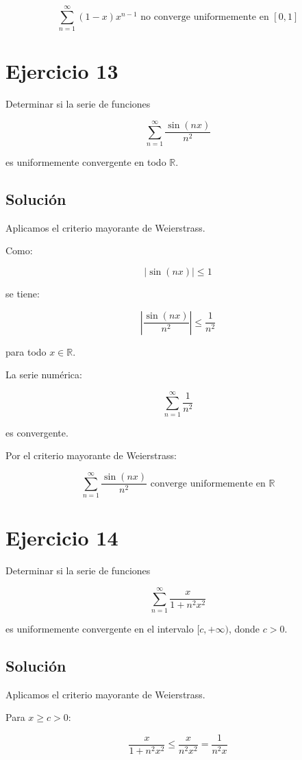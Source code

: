 \documentclass[fleqn]{article}
\begin{document}
	\[
	\boxed{
	\sum_{n=1}^{\infty}(1-x)x^{n-1}
	\text{ no converge uniformemente en }[0,1]
	}
	\]

\section{Ejercicio 13}
	Determinar si la serie de funciones

	\[
	\sum_{n=1}^{\infty}\frac{\sin(nx)}{n^2}
	\]

	es uniformemente convergente en todo $\mathbb{R}$.

	\subsection{Solución}

	Aplicamos el criterio mayorante de Weierstrass.

	Como:

	\[
	|\sin(nx)|\leq 1
	\]

	se tiene:

	\[
	\left|
	\frac{\sin(nx)}{n^2}
	\right|
	\leq
	\frac{1}{n^2}
	\]

	para todo $x\in\mathbb{R}$.

	La serie numérica:

	\[
	\sum_{n=1}^{\infty}\frac{1}{n^2}
	\]

	es convergente.

	Por el criterio mayorante de Weierstrass:

	\[
	\boxed{
	\sum_{n=1}^{\infty}\frac{\sin(nx)}{n^2}
	\text{ converge uniformemente en }\mathbb{R}
	}
	\]

\section{Ejercicio 14}
	Determinar si la serie de funciones

	\[
	\sum_{n=1}^{\infty}
	\frac{x}{1+n^2x^2}
	\]

	es uniformemente convergente en el intervalo $[c,+\infty)$, donde $c>0$.

	\subsection{Solución}

	Aplicamos el criterio mayorante de Weierstrass.

	Para $x\geq c>0$:

	\[
	\frac{x}{1+n^2x^2}
	\leq
	\frac{x}{n^2x^2}
	=
	\frac{1}{n^2x}
	\]
\end{document}
